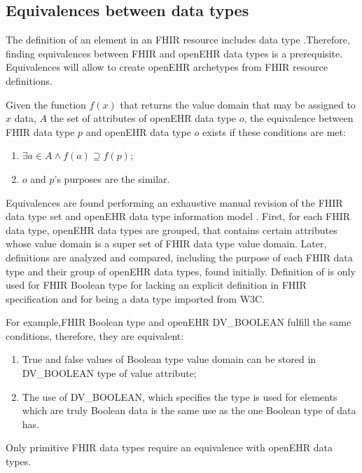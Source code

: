 \subsection{Equivalences between data types}

The definition of an element in an FHIR resource includes data type \cite{FHIRElement}.Therefore, finding equivalences between FHIR and openEHR data types is a prerequisite. Equivalences will allow to create openEHR archetypes from FHIR resource definitions.

Given the function \( f(x) \) that returns the value domain that may be assigned to \( x \) data, \( A \) the set of attributes of openEHR data type \( o \), the equivalence between FHIR data type \( p \) and openEHR data type \( o \) exists if these conditions are met:

\begin{enumerate}
  \item \( \exists a \in A \land f(a) \supseteq f(p) \);
  \item \( o \) and \( p \)'s purposes are the similar.
\end{enumerate}

Equivalences are found performing an exhaustive manual revision of the FHIR data type set \cite{FHIRDataTypes} and openEHR data type information model \cite{openEHRDataTypes}. First, for each FHIR data type, openEHR data types are grouped, that contains certain attributes whose value domain is a super set of FHIR data type value domain. Later, definitions are analyzed and compared, including the purpose of each FHIR data type and their group of openEHR data types, found initially. Definition of \cite{W3C} is only used for FHIR Boolean type for lacking an explicit definition in FHIR specification and for being a data type imported from W3C.

For example,FHIR Boolean type and openEHR DV\_\-BOOLEAN fulfill the same conditions, therefore, they are equivalent:
\begin{enumerate}
  \item True and false values of Boolean type value domain can be stored in DV\_BOOLEAN type of value attribute;
  \item The use of DV\_BOOLEAN, which specifies the type is used for elements which are truly Boolean data is the same use as the one Boolean type of data has.
\end{enumerate}

Only primitive FHIR data types require an equivalence with openEHR data types.
